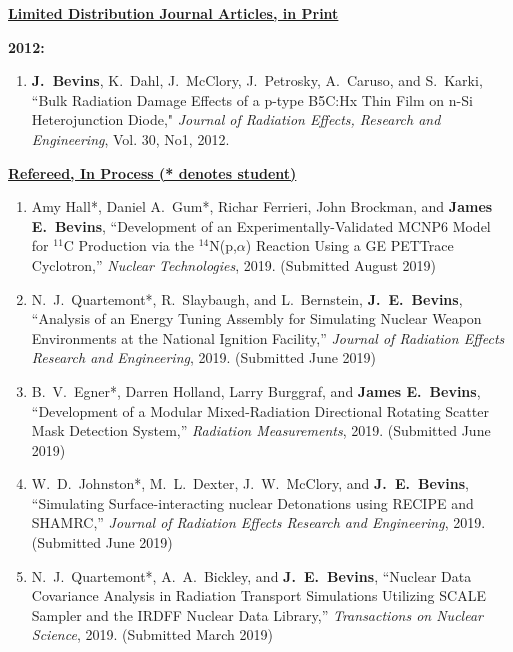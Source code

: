 
\underline{\textbf{Limited Distribution Journal Articles, in Print }}

\textbf{2012:}
\begin{enumerate}
  \item \textbf{J.\ Bevins}, K.\ Dahl, J.\ McClory, J.\ Petrosky, A.\ Caruso, and S.\ Karki, ``Bulk Radiation Damage Effects of a p-type B5C:Hx Thin Film on n-Si Heterojunction Diode," \textit{Journal of Radiation Effects, Research and Engineering}, Vol. 30, No1, 2012.
\end{enumerate}


\underline{\textbf{Refereed, In Process (* denotes student)}}

\begin{enumerate}
  \item Amy Hall*, Daniel A.\ Gum*, Richar Ferrieri, John Brockman, and \textbf{James E.\ Bevins}, ``Development of an Experimentally-Validated MCNP6 Model for $^{11}$C Production via the $^{14}$N(p,$\alpha$) Reaction Using a GE PETTrace Cyclotron,” \textit{Nuclear Technologies}, 2019. (Submitted August 2019)
  
  \item N.\ J.\ Quartemont*, R.\ Slaybaugh, and L.\ Bernstein, \textbf{J.\ E.\ Bevins}, ``Analysis of an Energy Tuning Assembly for Simulating Nuclear Weapon Environments at the National Ignition Facility,” \textit{Journal of Radiation Effects Research and Engineering}, 2019. (Submitted June 2019)

  \item B.\ V.\ Egner*, Darren Holland, Larry Burggraf, and \textbf{James E.\ Bevins}, ``Development of a Modular Mixed-Radiation Directional Rotating Scatter Mask Detection System,” \textit{Radiation Measurements}, 2019. (Submitted June 2019)

   \item W.\ D.\ Johnston*, M.\ L.\ Dexter, J.\ W.\ McClory, and \textbf{J.\ E.\ Bevins}, ``Simulating Surface-interacting nuclear Detonations using RECIPE and SHAMRC,” \textit{Journal of Radiation Effects Research and Engineering}, 2019. (Submitted June 2019)
  
  \item N.\ J.\ Quartemont*, A.\ A.\ Bickley, and \textbf{J.\ E.\ Bevins}, ``Nuclear Data Covariance Analysis in Radiation Transport Simulations Utilizing SCALE Sampler and the IRDFF Nuclear Data Library,” \textit{Transactions on Nuclear Science}, 2019. (Submitted March 2019)
  
\end{enumerate}

